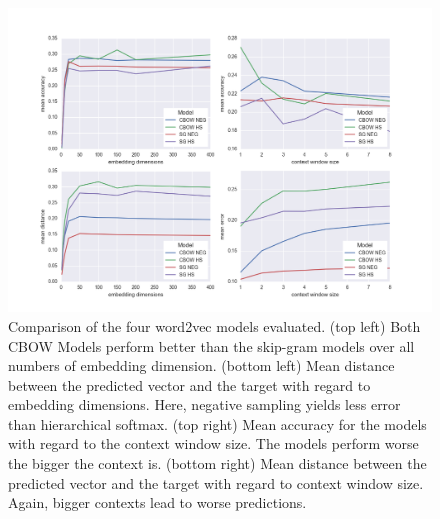 \documentclass[11pt]{article}
\begin{document}
\begin{figure}[h!] %
   \centering
   \includegraphics[width=\textwidth]{4models_comparison_meanAccLossTopn1} 
   \caption{Comparison of the four word2vec models evaluated. (top left) Both CBOW Models perform better than the skip-gram models over all numbers of embedding dimension. (bottom left) Mean distance between the predicted vector and the target with regard to embedding dimensions. Here, negative sampling yields less error than hierarchical softmax. (top right) Mean accuracy for the models with regard to the context window size. The models perform worse the bigger the context is. (bottom right) Mean distance between the predicted vector and the target with regard to context window size. Again, bigger contexts lead to worse predictions. }
   \label{fig:4models_comparison_meanAccLossTopn1}
\end{figure}
\end{document}
